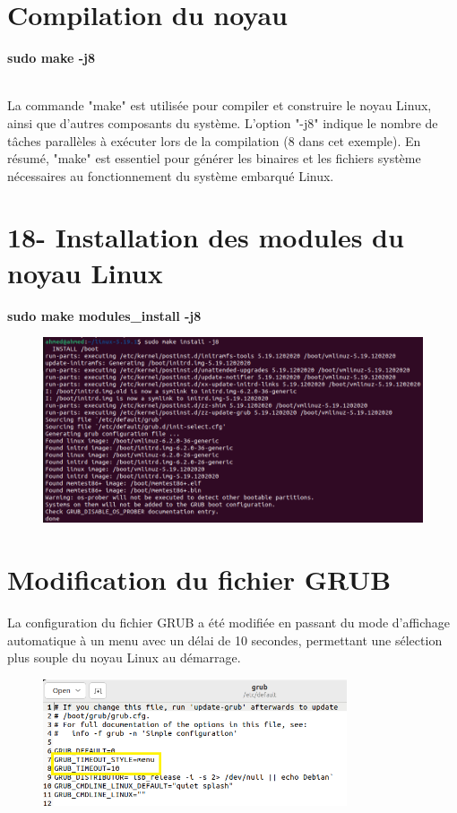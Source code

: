 \section{Compilation du noyau}
\textbf{sudo make -j8}

\\La commande "make" est utilisée pour compiler et construire le noyau Linux, ainsi que d'autres composants du système. L'option "-j8" indique le nombre de tâches parallèles à exécuter lors de la compilation (8 dans cet exemple). En résumé, "make" est essentiel pour générer les binaires et les fichiers système nécessaires au fonctionnement du système embarqué Linux.
\section{18-	Installation des modules du noyau Linux }
\textbf{sudo make modules\_install -j8}
\begin{figure}[h]
    \includegraphics[width=1\textwidth]{images/39.png}   
\end{figure}

\section{Modification du fichier GRUB }
La configuration du fichier GRUB a été modifiée en passant du mode d'affichage automatique à un menu avec un délai de 10 secondes, permettant une sélection plus souple du noyau Linux au démarrage.
\newpage
\begin{figure}[h]
    \includegraphics[width=0.8\textwidth]{images/40.png}   
\end{figure}
